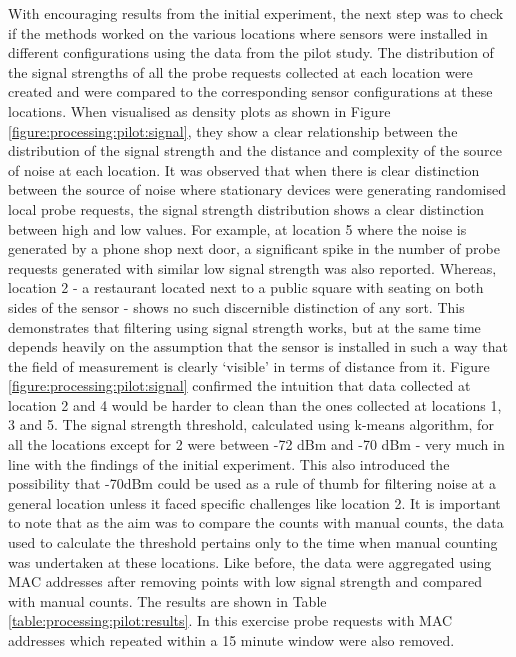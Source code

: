 With encouraging results from the initial experiment, the next step was to check if the methods worked on the various locations where sensors were installed in different configurations using the data from the pilot study.
The distribution of the signal strengths of all the probe requests collected at each location were created and were compared to the corresponding sensor configurations at these locations.
When visualised as density plots as shown in Figure \ref{figure:processing:pilot:signal}, they show a clear relationship between the distribution of the signal strength and the distance and complexity of  the source of noise at each location.
It was observed that when there is clear distinction between the source of noise where stationary devices were generating randomised local probe requests, the signal strength distribution shows a clear distinction between high and low values.
For example, at location 5 where the noise is generated by a phone shop next door, a significant spike in the number of probe requests generated with similar low signal strength was also reported.
Whereas, location 2 - a restaurant located  next to a public square  with seating on both sides   of the sensor - shows no such discernible distinction of any sort.
This demonstrates that filtering using signal strength works, but at the same time depends heavily on the assumption that the sensor is installed in such a way that the field of measurement is clearly ‘visible’ in terms of distance from it.
Figure \ref{figure:processing:pilot:signal} confirmed the intuition that data collected at location 2 and 4 would be harder to clean than the ones collected at locations 1, 3 and 5.
The signal strength threshold, calculated using k-means algorithm, for all the locations except for 2 were between -72 dBm and -70 dBm - very much in line with the findings of the initial experiment.
This also introduced the possibility that -70dBm could be used as a rule of thumb for filtering noise at a general location unless it faced specific challenges like location 2.
It is important to note that as the aim was  to compare the counts with manual counts, the data used  to calculate the threshold pertains only to the time when manual counting was undertaken at these locations.
Like before, the data were aggregated using MAC addresses after removing points with low signal strength and compared with manual counts.
The results are shown in Table \ref{table:processing:pilot:results}.
In this exercise probe requests with MAC addresses which repeated within a 15 minute window were also removed.

